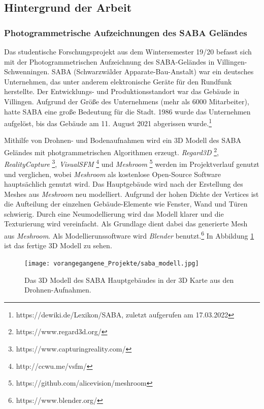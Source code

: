 \subsection{Hintergrund der Arbeit}
\subsubsection{Photogrammetrische Aufzeichnungen des SABA Geländes}
Das studentische Forschungsprojekt aus dem Wintersemester 19/20 \cite{reich2020} befasst sich mit  der Photogrammetrischen Aufzeichnung des SABA-Geländes in Villingen-Schwenningen. SABA (Schwarzwälder Apparate-Bau-Anstalt) war ein deutsches Unternehmen, das unter anderem elektronische Geräte für den Rundfunk herstellte. Der Entwicklungs- und Produktionsstandort war das Gebäude in Villingen. Aufgrund der Größe des Unternehmens (mehr als 6000 Mitarbeiter), hatte SABA eine große Bedeutung für die Stadt. 1986 wurde das Unternehmen aufgelöst, bis das Gebäude am 11. August 2021 abgerissen wurde.\footnote{https://dewiki.de/Lexikon/SABA, zuletzt aufgerufen am 17.03.2022} 

Mithilfe von Drohnen- und Bodenaufnahmen wird ein 3D Modell des SABA Geländes mit photgrammetrischen Algorithmen erzeugt. \textit{Regard3D} \footnote{https://www.regard3d.org/}, \textit{RealityCapture} \footnote{https://www.capturingreality.com/}, \textit{VisualSFM} \footnote{http://ccwu.me/vsfm/} und \textit{Meshroom} \footnote{https://github.com/alicevision/meshroom} werden im Projektverlauf genutzt und verglichen, wobei \textit{Meshroom} als kostenlose Open-Source Software hauptsächlich genutzt wird. Das Hauptgebäude wird nach der Erstellung des Meshes aus \textit{Meshroom} neu modelliert. Aufgrund der hohen Dichte der Vertices ist die Aufteilung der einzelnen Gebäude-Elemente wie Fenster, Wand und Türen schwierig. Durch eine Neumodellierung wird das Modell klarer und die Texturierung wird vereinfacht. Als Grundlage dient dabei das generierte Mesh aus \textit{Meshroom}. Als Modellierunssoftware wird \textit{Blender} benutzt.\footnote{https://www.blender.org/} In Abbildung \ref{fig:SABA3DModell} ist das fertige 3D Modell zu sehen.

\begin{figure}[ht]
    \centering
    \texttt{[image: vorangegangene\_Projekte/saba\_modell.jpg]}
    \caption{Das 3D Modell des SABA Hauptgebäudes in der 3D Karte aus den Drohnen-Aufnahmen.}
    \label{fig:SABA3DModell}
\end{figure}

